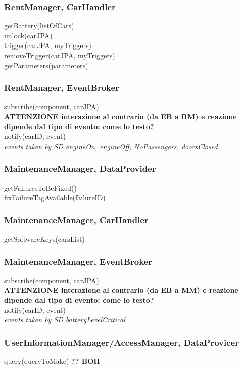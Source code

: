 \subsubsection{RentManager, CarHandler}
getBattery(listOfCars) \\
unlock(carJPA) \\
trigger(carJPA, myTriggers) \\
removeTrigger(carJPA, myTriggers) \\
getParameters(parameters) \\ %

\subsubsection{RentManager, EventBroker}
subscribe(component, carJPA) \\
\textbf{ATTENZIONE interazione al contrario (da EB a RM) e reazione dipende dal tipo di evento: come lo testo?} \\
notify(carID, event) \\
\emph{events taken by SD engineOn, engineOff, NoPassengers, doorsClosed}

\subsubsection{MaintenanceManager, DataProvider}
getFailuresToBeFixed()\\
fixFailureTagAvailable(failureID)

\subsubsection{MaintenanceManager, CarHandler}
getSoftwareKeys(carsList) 

\subsubsection{MaintenanceManager, EventBroker}
subscribe(component, carJPA) \\
\textbf{ATTENZIONE interazione al contrario (da EB a MM) e reazione dipende dal tipo di evento: come lo testo?} \\
notify(carID, event) \\
\emph{events taken by SD batteryLevelCritical}

\subsubsection{UserInformationManager/AccessManager, DataProvicer}
query(queryToMake) \textbf{?? BOH}

